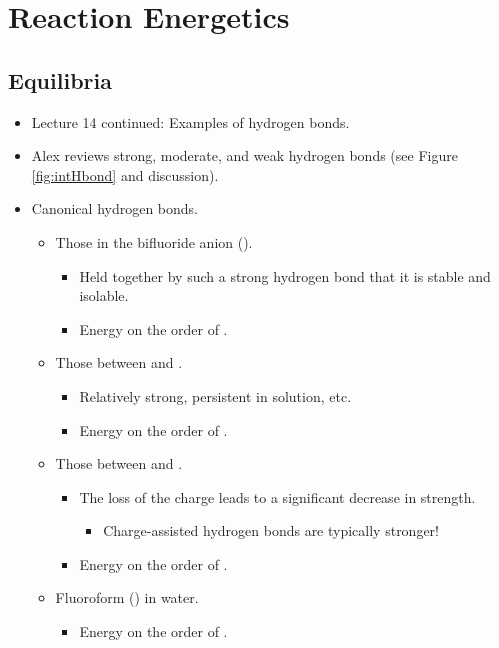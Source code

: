 \documentclass[../notes.tex]{subfiles}
\begin{document}
\chapter{Reaction Energetics}
\section{Equilibria}
\begin{itemize}
    \item {}Lecture 14 continued: Examples of hydrogen bonds.
    \item Alex reviews strong, moderate, and weak hydrogen bonds (see Figure \ref{fig:intHbond} and discussion).
    \item Canonical hydrogen bonds.
    \begin{itemize}
        \item Those in the bifluoride anion ().
        \begin{itemize}
            \item Held together by such a strong hydrogen bond that it is stable and isolable.
            \item Energy on the order of .
        \end{itemize}
        \item Those between  and .
        \begin{itemize}
            \item Relatively strong, persistent in solution, etc.
            \item Energy on the order of .
        \end{itemize}
        \item Those between  and .
        \begin{itemize}
            \item The loss of the charge leads to a significant decrease in strength.
            \begin{itemize}
                \item Charge-assisted hydrogen bonds are typically stronger!
            \end{itemize}
            \item Energy on the order of .
        \end{itemize}
        \item Fluoroform () in water.
        \begin{itemize}
            \item Energy on the order of .

\end{itemize}
\end{itemize}
\end{itemize}
\end{document}
